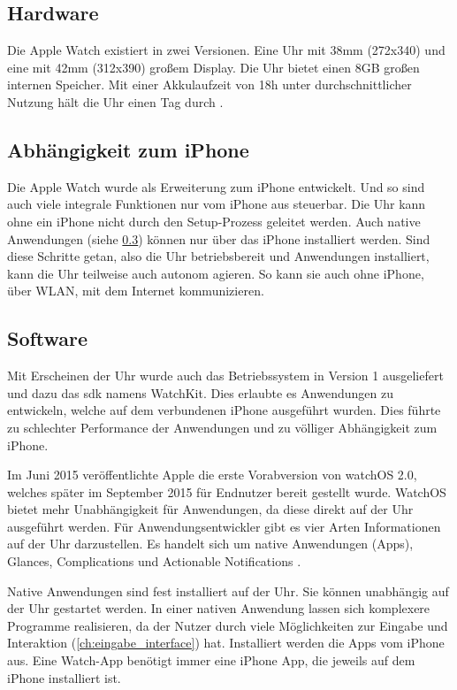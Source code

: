 \subsection{Hardware}
Die Apple Watch existiert in zwei Versionen. Eine Uhr mit 38mm (272x340) und eine mit 42mm (312x390) großem Display. Die Uhr bietet einen 8GB großen internen Speicher. Mit einer Akkulaufzeit von 18h unter durchschnittlicher Nutzung hält die Uhr einen Tag durch \cite{Riches:2015aa}. 
\subsection{Abhängigkeit zum iPhone}
Die Apple Watch wurde als Erweiterung zum iPhone entwickelt. Und so sind auch viele integrale Funktionen nur vom iPhone aus steuerbar. Die Uhr kann ohne ein iPhone nicht durch den Setup-Prozess geleitet werden. Auch native Anwendungen (siehe \ref{ch:watch_software}) können nur über das iPhone installiert werden. Sind diese Schritte getan, also die Uhr betriebsbereit und Anwendungen installiert, kann die Uhr teilweise auch autonom agieren. So kann sie auch ohne iPhone, über WLAN, mit dem Internet kommunizieren.

\subsection{Software}
\label{ch:watch_software}
Mit Erscheinen der Uhr wurde auch das Betriebssystem in Version 1 ausgeliefert und dazu das \gls{sdk} namens WatchKit. Dies erlaubte es Anwendungen zu entwickeln, welche auf dem verbundenen iPhone ausgeführt wurden. Dies führte zu schlechter Performance der Anwendungen und zu völliger Abhängigkeit zum iPhone.

Im Juni 2015 veröffentlichte Apple die erste Vorabversion von watchOS 2.0, welches später im September 2015 für Endnutzer bereit gestellt wurde. WatchOS bietet mehr Unabhängigkeit für Anwendungen, da diese direkt auf der Uhr ausgeführt werden. Für Anwendungsentwickler gibt es vier Arten Informationen auf der Uhr darzustellen. Es handelt sich um native Anwendungen (Apps), Glances, Complications und Actionable Notifications \cite{Apple:2015devAw}.

Native Anwendungen sind fest installiert auf der Uhr. Sie können unabhängig auf der Uhr gestartet werden. In einer nativen Anwendung lassen sich komplexere Programme realisieren, da der Nutzer durch viele Möglichkeiten zur Eingabe und Interaktion (\ref{ch:eingabe_interface}) hat. Installiert werden die Apps vom iPhone aus. Eine Watch-App benötigt immer eine iPhone App, die jeweils auf dem iPhone installiert ist.

